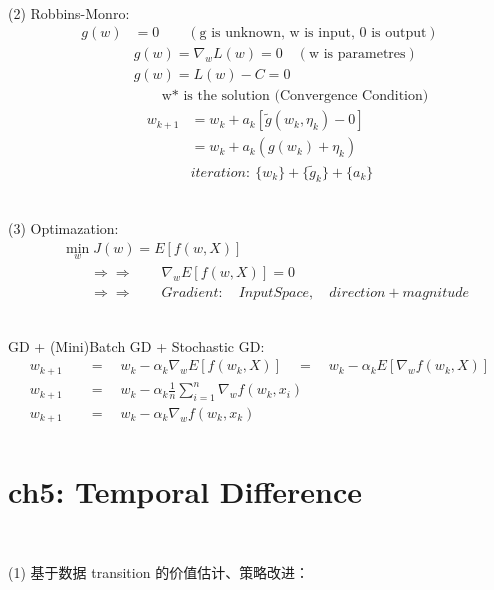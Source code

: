 \documentclass{article}
\begin{document}
~ \\[3pt]
(2) Robbins-Monro: 
\begin{align*}
    g(w) 
    & = 0 \qquad (\text{g is unknown, w is input, 0 is output}) \\[3pt]
    & g(w) = \nabla_{w} L(w) = 0 \quad (\text{w is parametres}) \\[3pt]
    & g(w) = L(w) - C = 0 \\[3pt]
    & \qquad \text{w* is the solution (Convergence Condition)}
\end{align*}
\begin{align*}
    w_{k+1} &= w_{k} + a_{k} \left[ 
            \tilde{g} \left( w_{k}, \eta_{k} \right) - 0 \right] \\[3pt]
            &= w_{k} + a_{k} 
            \left( g(w_{k}) + \eta_{k} \right) \\[3pt]
            & iteration: \ \{w_{k}\} + \{\tilde{g}_{k}\} + \{a_{k}\} 
\end{align*}


~ \\[3pt]
(3) Optimazation: 
\begin{align*}
    & \min_{w} J(w) = E \left[ f(w, X) \right] \\[3pt]
    & \qquad \Rightarrow \Rightarrow \qquad 
    \nabla_{w} E \left[ f(w, X) \right] = 0 \\[3pt]
    & \qquad \Rightarrow \Rightarrow \qquad 
    Gradient: \quad InputSpace, \quad direction + magnitude 
\end{align*}


~ \\[3pt]
GD \quad + \quad (Mini)Batch GD \quad + \quad Stochastic GD: 
\begin{align*}
    w_{k+1} & 
            \quad = \quad w_{k} - \alpha_{k} 
            \nabla_{w} E \left[ f(w_{k}, X) \right] 
            \quad = \quad w_{k} - \alpha_{k} 
            E \left[ \nabla_{w} f(w_{k}, X) \right] \\[3pt]
    w_{k+1} & 
            \quad = \quad w_{k} - \alpha_{k} 
            \frac {1} {n} \sum_{i=1}^{n} 
            \nabla_{w} f(w_{k}, x_{i}) \\[3pt]
    w_{k+1} & 
            \quad = \quad w_{k} - \alpha_{k} 
            \nabla_{w} f(w_{k}, x_{k}) \\[3pt]
\end{align*}


\newpage
\section*{ch5: Temporal Difference}


~ \\[3pt]
\begin{CJK}{UTF8}{gbsn}
    (1) 基于数据 transition 的价值估计、策略改进： \\[3pt]
\end{CJK}
\end{document}
